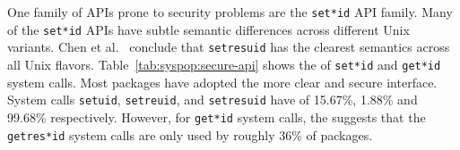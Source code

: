 

One family of APIs prone to security problems are the %
{\tt set*id} API family.
Many of the {\tt set*id} APIs
have subtle semantic differences across different Unix variants.
Chen et al.~\citep{chen02setuid} conclude that 
{\tt setresuid} has the clearest semantics 
across all Unix flavors. 
Table~\ref{tab:syspop:secure-api} shows the \unwusagemetric{} 
of {\tt set*id} and {\tt get*id} system calls.
Most packages have 
adopted the more clear and secure interface. 
System calls {\tt setuid}, {\tt setreuid}, and {\tt setresuid} have
\unwusagemetric{} of 15.67\%, 1.88\% and 99.68\% respectively. 
However, for {\tt get*id} system calls, the \unwusagemetric{} suggests that the {\tt getres*id}
system calls %
are only used by roughly 36\% of packages.

